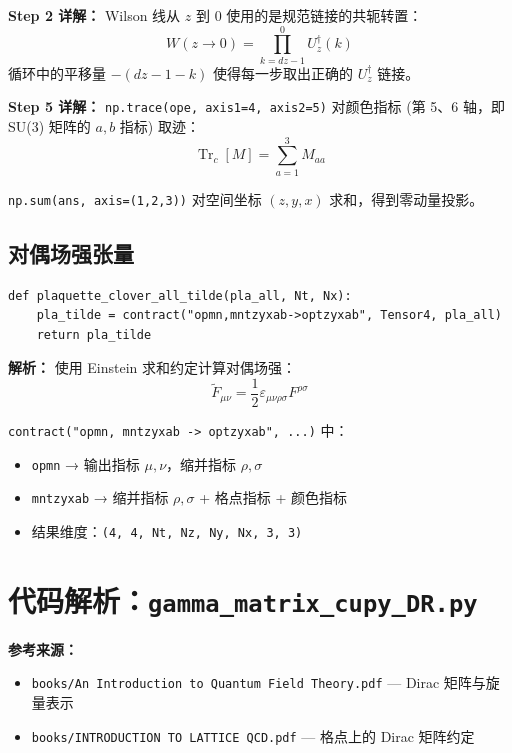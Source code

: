 \documentclass[12pt,a4paper]{ctexart}
\begin{document}
\textbf{Step 2 详解：} Wilson 线从 $z$ 到 $0$ 使用的是规范链接的共轭转置：
\begin{equation}
W(z \to 0) = \prod_{k=dz-1}^{0} U_z^\dagger(k)
\end{equation}
循环中的平移量 $-(dz-1-k)$ 使得每一步取出正确的 $U_z^\dagger$ 链接。

\textbf{Step 5 详解：}
\texttt{np.trace(ope, axis1=4, axis2=5)} 对颜色指标 (第 5、6 轴，即 SU(3) 矩阵的 $a,b$ 指标) 取迹：
\begin{equation}
\operatorname{Tr}_c[M] = \sum_{a=1}^{3} M_{aa}
\end{equation}

\texttt{np.sum(ans, axis=(1,2,3))} 对空间坐标 $(z,y,x)$ 求和，得到零动量投影。

\subsection{对偶场强张量}

\begin{lstlisting}[caption={对偶场强张量计算}]
def plaquette_clover_all_tilde(pla_all, Nt, Nx):
    pla_tilde = contract("opmn,mntzyxab->optzyxab", Tensor4, pla_all)
    return pla_tilde
\end{lstlisting}

\textbf{解析：}
使用 Einstein 求和约定计算对偶场强：
\begin{equation}
\tilde{F}_{\mu\nu} = \frac{1}{2} \varepsilon_{\mu\nu\rho\sigma} F^{\rho\sigma}
\end{equation}

\texttt{contract("opmn, mntzyxab -> optzyxab", ...)} 中：
\begin{itemize}
    \item \texttt{opmn} → 输出指标 $\mu, \nu$，缩并指标 $\rho, \sigma$
    \item \texttt{mntzyxab} → 缩并指标 $\rho, \sigma$ + 格点指标 + 颜色指标
    \item 结果维度：\texttt{(4, 4, Nt, Nz, Ny, Nx, 3, 3)}
\end{itemize}

\section{代码解析：\texttt{gamma\_matrix\_cupy\_DR.py}}
\label{sec:gamma}

\textbf{参考来源：}
\begin{itemize}
    \item \texttt{books/An Introduction to Quantum Field Theory.pdf} — Dirac 矩阵与旋量表示
    \item \texttt{books/INTRODUCTION TO LATTICE QCD.pdf} — 格点上的 Dirac 矩阵约定
\end{itemize}
\end{document}
